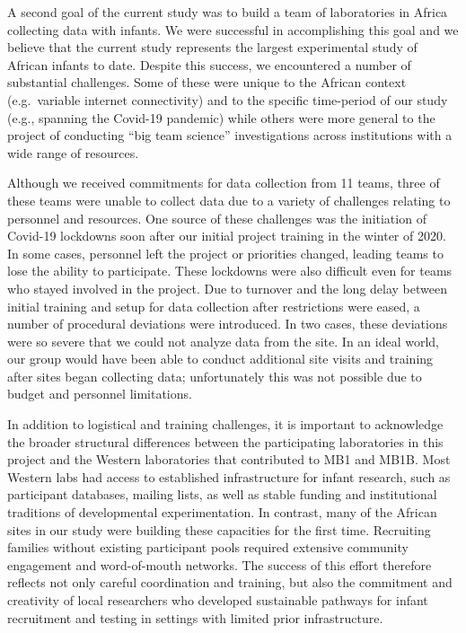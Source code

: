 \documentclass[
  english,
  ,man,floatsintext]{apa6}
\begin{document}
A second goal of the current study was to build a team of laboratories in Africa collecting data with infants. We were successful in accomplishing this goal and we believe that the current study represents the largest experimental study of African infants to date. Despite this success, we encountered a number of substantial challenges. Some of these were unique to the African context (e.g.~variable internet connectivity) and to the specific time-period of our study (e.g., spanning the Covid-19 pandemic) while others were more general to the project of conducting ``big team science'' investigations across institutions with a wide range of resources.

Although we received commitments for data collection from 11 teams, three of these teams were unable to collect data due to a variety of challenges relating to personnel and resources. One source of these challenges was the initiation of Covid-19 lockdowns soon after our initial project training in the winter of 2020. In some cases, personnel left the project or priorities changed, leading teams to lose the ability to participate. These lockdowns were also difficult even for teams who stayed involved in the project. Due to turnover and the long delay between initial training and setup for data collection after restrictions were eased, a number of procedural deviations were introduced. In two cases, these deviations were so severe that we could not analyze data from the site. In an ideal world, our group would have been able to conduct additional site visits and training after sites began collecting data; unfortunately this was not possible due to budget and personnel limitations.

In addition to logistical and training challenges, it is important to acknowledge the broader structural differences between the participating laboratories in this project and the Western laboratories that contributed to MB1 and MB1B. Most Western labs had access to established infrastructure for infant research, such as participant databases, mailing lists, as well as stable funding and institutional traditions of developmental experimentation. In contrast, many of the African sites in our study were building these capacities for the first time. Recruiting families without existing participant pools required extensive community engagement and word-of-mouth networks. The success of this effort therefore reflects not only careful coordination and training, but also the commitment and creativity of local researchers who developed sustainable pathways for infant recruitment and testing in settings with limited prior infrastructure.
\end{document}
